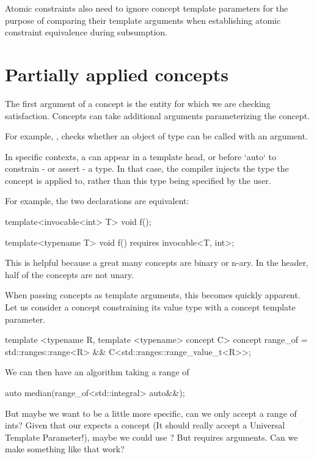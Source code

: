 \documentclass{wg21}
\begin{document}
Atomic constraints also need to ignore concept template parameters for the purpose
of comparing their template arguments when establishing atomic constraint equivalence during subsumption.


\section{Partially applied concepts}

The first argument of a concept is the entity for which we are checking satisfaction.
Concepts can take additional arguments parameterizing the concept.

For example, , checks whether an object of type  can be called
with an  argument.

In specific contexts, a  can appear in a template head, or before `auto` to constrain - or assert -
a type. In that case, the compiler injects the type the concept is applied to, rather than this type being specified by the user.

For example, the two declarations are equivalent:

\begin{colorblock}
template<invocable<int> T>
void f();

template<typename T>
void f() requires invocable<T, int>;
\end{colorblock}

This is helpful because a great many concepts are binary or n-ary.
In the  header, half of the concepts are not unary.


When passing concepts as template arguments, this becomes quickly apparent.
Let us consider a  concept constraining its value type with a concept template parameter.

\begin{colorblock}
template <typename R, template <typename> concept C>
concept range_of = std::ranges::range<R> && C<std::ranges::range_value_t<R>>;
\end{colorblock}

We can then have an algorithm taking a range of 

\begin{colorblock}
auto median(range_of<std::integral> auto&&);
\end{colorblock}


But maybe we want to be a little more specific, can we only accept a range of ints?
Given that our  expects a concept (It should really accept a Universal Template Parameter!),
maybe we could use ?
But  requires arguments. Can we make something like that work?
\end{document}
